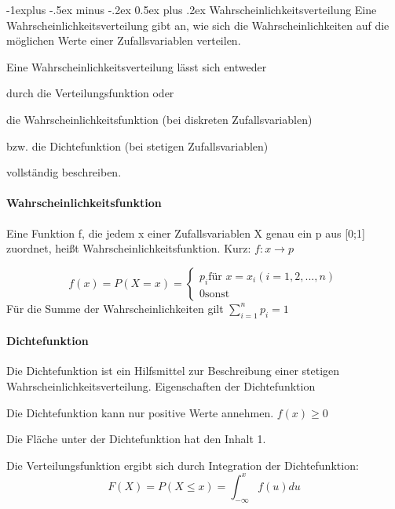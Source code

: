 \documentclass[a4paper]{article}
\makeatletter
\renewcommand{\subsection}{\@startsection{subsection}{2}{0mm}%
                                {-1explus -.5ex minus -.2ex}%
                                {0.5ex plus .2ex}%
                                {\normalfont\normalsize\bfseries}}
\makeatother
\begin{document}
\begin{multicols}{3}
  \subsection{Wahrscheinlichkeitsverteilung}
  Eine Wahrscheinlichkeitsverteilung gibt an, wie sich die Wahrscheinlichkeiten auf die möglichen Werte einer Zufallsvariablen verteilen.

  Eine Wahrscheinlichkeitsverteilung lässt sich entweder
  \begin{itemize*}
    \item durch die Verteilungsfunktion oder
    \item die Wahrscheinlichkeitsfunktion (bei diskreten Zufallsvariablen)
    \item bzw. die Dichtefunktion (bei stetigen Zufallsvariablen)
  \end{itemize*}
  vollständig beschreiben.

  \paragraph{Wahrscheinlichkeitsfunktion}
  Eine Funktion f, die jedem x einer Zufallsvariablen X genau ein p aus [0;1] zuordnet, heißt Wahrscheinlichkeitsfunktion. Kurz: $f:x\rightarrow p$

  $$f(x)=P(X=x)= \begin{cases} p_i \text{für } x=x_i (i=1,2,...,n) \\ 0 \text{sonst} \end{cases}$$
  Für die Summe der Wahrscheinlichkeiten gilt $\sum_{i=1}^n p_i=1$

  \paragraph{Dichtefunktion}
  Die Dichtefunktion ist ein Hilfsmittel zur Beschreibung einer stetigen Wahrscheinlichkeitsverteilung. Eigenschaften der Dichtefunktion
  \begin{itemize*}
    \item Die Dichtefunktion kann nur positive Werte annehmen. $f(x) \geq 0$
    \item Die Fläche unter der Dichtefunktion hat den Inhalt 1.
  \end{itemize*}
  Die Verteilungsfunktion ergibt sich durch Integration der Dichtefunktion:
  $$F(X)=P(X\leq x)=\int_{-\infty}^x f(u)du$$


\end{multicols}
\end{document}

